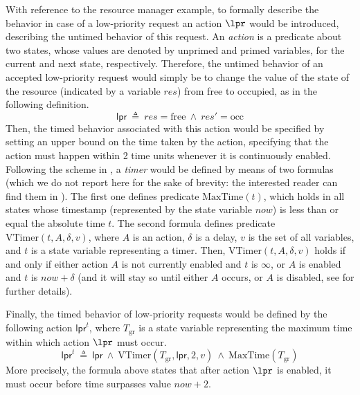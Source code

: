 With reference to the resource manager example, to formally describe 
the behavior in case of a low-priority request an action $\lpr$ 
would be introduced, describing the untimed behavior of this 
request. An \emph{action} is a predicate about two states, whose 
values are denoted by unprimed and primed variables, for the current and 
next state, respectively. Therefore, the untimed behavior of 
an accepted low-priority request would simply be to change the 
value of the state of the resource (indicated by a variable $res$)
from free to occupied, as in the following definition.
\begin{equation*}
	 \mathsf{lpr} \ \triangleq \ res = \text{free}  \ \wedge\   res' = \text{occ}
\end{equation*}
Then, the timed behavior associated with this action would be 
specified by setting an upper bound on the time taken by the 
action, specifying that the action must happen within 2 time 
units whenever it is continuously enabled. Following the scheme 
in \cite{AL94}, a \emph{timer} would be defined by means of two formulas 
(which we do not report here for the sake of brevity: the interested 
reader can find them in \cite{AL94}). The first one defines predicate $\mathrm{MaxTime}(t)$,
which holds in all states whose timestamp (represented by the 
state variable $now$) is less than or equal the absolute time $t$.
The second formula defines predicate $\mathrm{VTimer}(t, A, \delta, v)$,
where $A$ is an action, $\delta$ is a delay, $v$ is 
the set of all variables, and $t$ is a state variable representing 
a timer. Then, $\mathrm{VTimer}(t, A, \delta, v)$ holds if 
and only if either action $A$ is not currently enabled and 
$t$ is $\infty$, or $A$ is enabled and $t$ is $now + \delta$ 
(and it will stay so until either $A$ occurs, or $A$ is disabled, 
see \cite[Sec.~3]{AL94} for further details).

Finally, the timed behavior of low-priority requests would be 
defined by the following action $\mathsf{lpr}^t$, where $T_\mathrm{gr}$ is a state variable representing 
the maximum time within which action $\lpr$ must occur.
  \begin{equation*}
	 \mathsf{lpr}^t \ \triangleq \ \mathsf{lpr} \ \wedge \ \mathrm{VTimer}(T_\mathrm{gr}, \mathsf{lpr}, 2, v) \ \wedge\ \mathrm{MaxTime}(T_\mathrm{gr})
  \end{equation*}
More precisely, the formula above states that after action $\lpr$ is enabled,
it must occur before time surpasses value $now + 2$.

